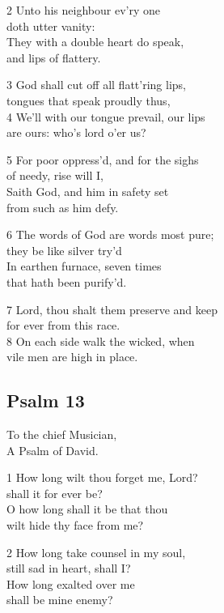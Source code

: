 2 Unto his neighbour ev’ry one\\
doth utter vanity:\\
They with a double heart do speak,\\
and lips of flattery.

3 God shall cut off all flatt’ring lips,\\
tongues that speak proudly thus,\\
4 We’ll with our tongue prevail, our lips\\
are ours: who’s lord o’er us?

5 For poor oppress’d, and for the sighs\\
of needy, rise will I,\\
Saith God, and him in safety set\\
from such as him defy.

6 The words of God are words most pure;\\
they be like silver try’d\\
In earthen furnace, seven times\\
that hath been purify’d.

7 Lord, thou shalt them preserve and keep\\
for ever from this race.\\
8 On each side walk the wicked, when\\
vile men are high in place.

\begin{center}
\quad{}\quad{}
\end{center}

\subsection*{Psalm 13 }

To the chief Musician,\\
A Psalm of David.

1 How long wilt thou forget me, Lord?\\
shall it for ever be?\\
O how long shall it be that thou\\
wilt hide thy face from me?

2 How long take counsel in my soul,\\
still sad in heart, shall I?\\
How long exalted over me\\
shall be mine enemy?

